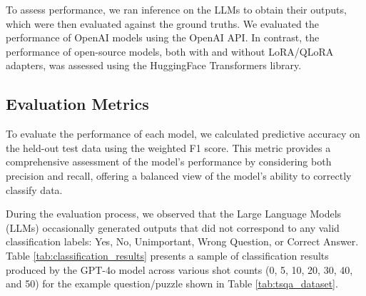 To assess performance, we ran inference on the LLMs to obtain their outputs, which were then evaluated against the ground truths. We evaluated the performance of OpenAI models using the OpenAI API.
In contrast, the performance of open-source models, both with and without LoRA/QLoRA adapters, was assessed using the HuggingFace Transformers library\cite{wolf2020transformers}.

\subsection{Evaluation Metrics}

To evaluate the performance of each model, we calculated predictive accuracy on the held-out test data using the weighted F1 score. This metric provides a comprehensive assessment of the model’s performance by considering both precision and recall, offering a balanced view of the model's ability to correctly classify data.

During the evaluation process, we observed that the Large Language Models (LLMs) occasionally generated outputs that did not correspond to any valid classification labels: Yes, No, Unimportant, Wrong Question, or Correct Answer. Table \ref{tab:classification_results} presents a sample of classification results produced by the GPT-4o model across various shot counts (0, 5, 10, 20, 30, 40, and 50) for the example question/puzzle shown in Table \ref{tab:tsqa_dataset}.

